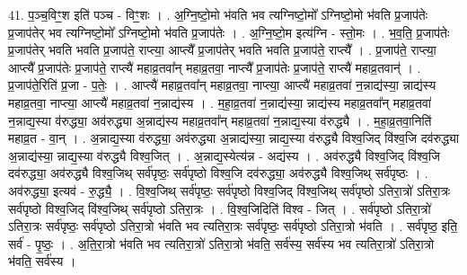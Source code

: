 \documentclass[17pt]{extarticle}
\begin{document}
41. प॒ञ्च॒विꣳ॒॒श इति॑ पञ्च - विꣳ॒॒शः । . अ॒ग्नि॒ष्टो॒मो भ॑वति भव त्यग्निष्टो॒मो᳚ ऽग्निष्टो॒मो भ॑वति प्र॒जाप॑तेः प्र॒जाप॑तेर् भव त्यग्निष्टो॒मो᳚ ऽग्निष्टो॒मो भ॑वति प्र॒जाप॑तेः । . अ॒ग्नि॒ष्टो॒म इत्य॑ग्नि - स्तो॒मः । . भ॒व॒ति॒ प्र॒जाप॑तेः प्र॒जाप॑तेर् भवति भवति प्र॒जाप॑ते॒ राप्त्या॒ आप्त्यै᳚ प्र॒जाप॑तेर् भवति भवति प्र॒जाप॑ते॒ राप्त्यै᳚ । . प्र॒जाप॑ते॒ राप्त्या॒ आप्त्यै᳚ प्र॒जाप॑तेः प्र॒जाप॑ते॒ राप्त्यै॑ महाव्र॒तवा᳚न् महाव्र॒तवा॒ नाप्त्यै᳚ प्र॒जाप॑तेः प्र॒जाप॑ते॒ राप्त्यै॑ महाव्र॒तवान्॑ । . प्र॒जाप॑ते॒रिति॑ प्र॒जा - प॒तेः॒ । . आप्त्यै॑ महाव्र॒तवा᳚न् महाव्र॒तवा॒ नाप्त्या॒ आप्त्यै॑ महाव्र॒तवा॑ न॒न्नाद्य॑स्या॒ न्नाद्य॑स्य महाव्र॒तवा॒ नाप्त्या॒ आप्त्यै॑ महाव्र॒तवा॑ न॒न्नाद्य॑स्य । . म॒हा॒व्र॒तवा॑ न॒न्नाद्य॑स्या॒ न्नाद्य॑स्य महाव्र॒तवा᳚न् महाव्र॒तवा॑ न॒न्नाद्य॒स्या व॑रुद्ध्या॒ अव॑रुद्ध्या अ॒न्नाद्य॑स्य महाव्र॒तवा᳚न् महाव्र॒तवा॑ न॒न्नाद्य॒स्या व॑रुद्ध्यै । . म॒हा॒व्र॒तवा॒निति॑ महाव्र॒त - वा॒न् । . अ॒न्नाद्य॒स्या व॑रुद्ध्या॒ अव॑रुद्ध्या अ॒न्नाद्य॑स्या॒ न्नाद्य॒स्या व॑रुद्ध्यै विश्व॒जिद् वि॑श्व॒जि दव॑रुद्ध्या अ॒न्नाद्य॑स्या॒ न्नाद्य॒स्या व॑रुद्ध्यै विश्व॒जित् । . अ॒न्नाद्य॒स्येत्य॑न्न - अद्य॑स्य । . अव॑रुद्ध्यै विश्व॒जिद् वि॑श्व॒जि दव॑रुद्ध्या॒ अव॑रुद्ध्यै विश्व॒जिथ् सर्व॑पृष्ठः॒ सर्व॑पृष्ठो विश्व॒जि दव॑रुद्ध्या॒ अव॑रुद्ध्यै विश्व॒जिथ् सर्व॑पृष्ठः । . अव॑रुद्ध्या॒ इत्यव॑ - रु॒द्ध्यै॒ । . वि॒श्व॒जिथ् सर्व॑पृष्ठः॒ सर्व॑पृष्ठो विश्व॒जिद् वि॑श्व॒जिथ् सर्व॑पृष्ठो ऽतिरा॒त्रो॑ ऽतिरा॒त्रः सर्व॑पृष्ठो विश्व॒जिद् वि॑श्व॒जिथ् सर्व॑पृष्ठो ऽतिरा॒त्रः । . वि॒श्व॒जिदिति॑ विश्व - जित् । . सर्व॑पृष्ठो ऽतिरा॒त्रो॑ ऽतिरा॒त्रः सर्व॑पृष्ठः॒ सर्व॑पृष्ठो ऽतिरा॒त्रो भ॑वति भव त्यतिरा॒त्रः सर्व॑पृष्ठः॒ सर्व॑पृष्ठो ऽतिरा॒त्रो भ॑वति । . सर्व॑पृष्ठ॒ इति॒ सर्व॑ - पृ॒ष्ठः॒ । . अ॒ति॒रा॒त्रो भ॑वति भव त्यतिरा॒त्रो॑ ऽतिरा॒त्रो भ॑वति॒ सर्व॑स्य॒ सर्व॑स्य भव त्यतिरा॒त्रो॑ ऽतिरा॒त्रो भ॑वति॒ सर्व॑स्य । \newline
\end{document}

